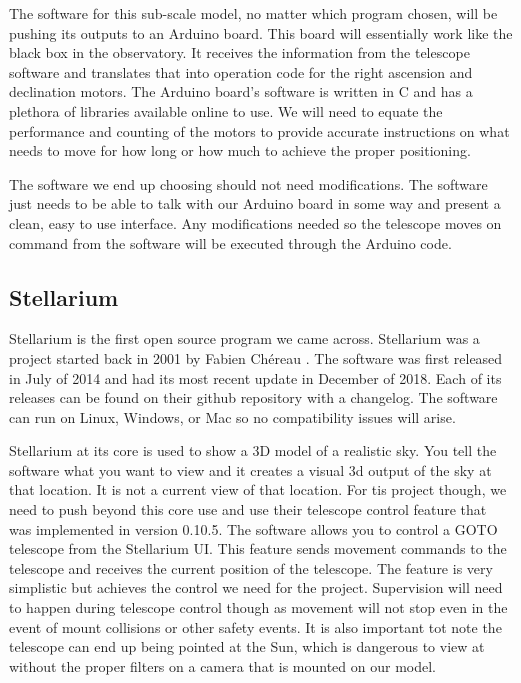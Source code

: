 \documentclass[12pt]{report}
\begin{document}
The software for this sub-scale model, no matter which program chosen, will be pushing its outputs to an Arduino board. This board will essentially work like the black box in the observatory. It receives the information from the telescope software and translates that into operation code for the right ascension and declination motors. The Arduino board's software is written in C and has a plethora of libraries available online to use. We will need to equate the performance and counting of the motors to provide accurate instructions on what needs to move for how long or how much to achieve the proper positioning.

The software we end up choosing should not need modifications. The software just needs to be able to talk with our Arduino board in some way and present a clean, easy to use interface. Any modifications needed so the telescope moves on command from the software will be executed through the Arduino code.

\subsection*{Stellarium}

Stellarium is the first open source program we came across. Stellarium was a project started back in 2001 by Fabien Chéreau \cite{stell}. The software was first released in July of 2014 and had its most recent update in December of 2018. Each of its releases can be found on their github repository with a changelog. The software can run on Linux, Windows, or Mac so no compatibility issues will arise.

Stellarium at its core is used to show a 3D model of a realistic sky. You tell the software what you want to view and it creates a visual 3d output of the sky at that location. It is not a current view of that location. For tis project though, we need to push beyond this core use and use their telescope control feature that was implemented in version 0.10.5. The software allows you to control a GOTO telescope from the Stellarium UI. This feature sends movement commands to the telescope and receives the current position of the telescope. The feature is very simplistic but achieves the control we need for the project. Supervision will need to happen during telescope control though as movement will not stop even in the event of mount collisions or other safety events. It is also important tot note the telescope can end up being pointed at the Sun, which is dangerous to view at without the proper filters on a camera that is mounted on our model.
\end{document}
